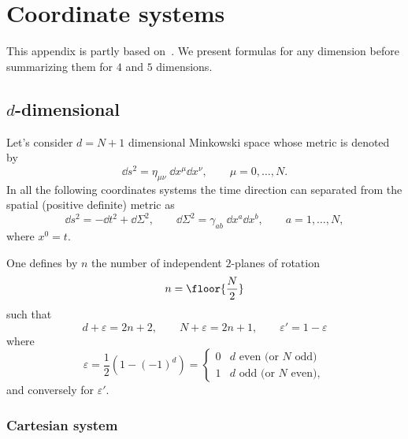 \section{Coordinate systems}
\label{app:coord}

This appendix is partly based on~\cite{Tangherlini:1963:SchwarzschildFieldDimensions, Myers:1986:BlackHolesHigher, Gibbons:2005:GeneralKerrdeSitter}.
We present formulas for any dimension before summarizing them for $4$ and $5$ dimensions.


\subsection{\texorpdfstring{$d$}{d}-dimensional}
\label{app:coord:general-d}


Let's consider $d = N + 1$ dimensional Minkowski space whose metric is denoted by
\begin{equation}
	\dd s^2 = \eta_{\mu\nu}\; \dd x^\mu \dd x^\nu, \qquad
	\mu = 0, \ldots, N.
\end{equation} 
In all the following coordinates systems the time direction can separated from the spatial (positive definite) metric as
\begin{equation}
	\dd s^2 = - \dd t^2 + \dd \Sigma^2, \qquad
	\dd \Sigma^2 = \gamma_{ab}\; \dd x^a \dd x^b, \qquad
	a = 1, \ldots, N,
\end{equation} 
where $x^0 = t$.

One defines by $n$ the number of independent $2$-planes of rotation
\begin{equation}
	n = \floor{\frac{N}{2}}
\end{equation} 
such that
\begin{equation}
	\label{coord:eq:d-dim-epsilon}
	d + \varepsilon = 2n + 2, \qquad
	N + \varepsilon = 2n + 1, \qquad
	\varepsilon' = 1 - \varepsilon
\end{equation} 
where
\begin{equation}
	\varepsilon = \frac{1}{2} (1 - (-1)^d ) =
	\begin{cases}
		0 & \text{$d$ even (or $N$ odd)} \\
		1 & \text{$d$ odd (or $N$ even)},
	\end{cases}
\end{equation} 
and conversely for $\varepsilon'$.


\subsubsection{Cartesian system}


